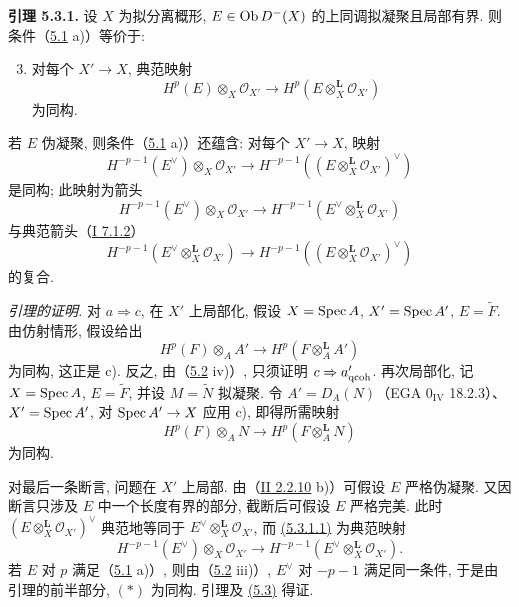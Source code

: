 \textbf{引理 5.3.1.} 设 \(X\) 为拟分离概形, \(E\in\operatorname{Ob} D^{-}(X)\) 的上同调拟凝聚且局部有界. 则条件（\hyperlink{sga6.e03.lem.5-1}{5.1} a)）等价于:
\begin{enumerate}[label=\alph*)]
\setcounter{enumi}{2}
\item 对每个 \(X'\to X\), 典范映射
\[
 H^p(E)\otimes_X\mathcal O_{X'}
 \longrightarrow
 H^p(E\otimes_X^{\mathbf L}\mathcal O_{X'})
\]
为同构.
\end{enumerate}
若 \(E\) 伪凝聚, 则条件（\hyperlink{sga6.e03.lem.5-1}{5.1} a)）还蕴含: 对每个 \(X'\to X\), 映射
\[
 H^{-p-1}(E^{\vee})\otimes_X\mathcal O_{X'}
 \longrightarrow
 H^{-p-1}((E\otimes_X^{\mathbf L}\mathcal O_{X'})^{\vee})
\tag{5.3.1.1}
\]
是同构; 此映射为箭头
\[
H^{-p-1}(E^{\vee})\otimes_X\mathcal O_{X'}
\longrightarrow H^{-p-1}(E^{\vee}\otimes_X^{\mathbf L}\mathcal O_{X'})
\]
与典范箭头（\hyperlink{sga6.e01.prop.7-1-2}{I 7.1.2}）
\[
H^{-p-1}(E^{\vee}\otimes_X^{\mathbf L}\mathcal O_{X'})
\longrightarrow H^{-p-1}((E\otimes_X^{\mathbf L}\mathcal O_{X'})^{\vee})
\]
的复合.

\emph{引理的证明.} 对 \(a\Rightarrow c\), 在 \(X'\) 上局部化, 假设 \(X=\operatorname{Spec} A\), \(X'=\operatorname{Spec} A'\), \(E=\widetilde F\). 由仿射情形, 假设给出
\[
 H^p(F)\otimes_AA'
 \longrightarrow
 H^p(F\otimes_A^{\mathbf L}A')
\]
为同构, 这正是 c). 反之, 由（\hyperlink{sga6.e03.rem.5-2}{5.2} iv)）, 只须证明 \(c\Rightarrow a'_{\mathrm{qcoh}}\). 再次局部化, 记 \(X=\operatorname{Spec} A\), \(E=\widetilde F\), 并设 \(M=\widetilde N\) 拟凝聚. 令 \(A'=D_A(N)\)（EGA \(0_{\mathrm{IV}}\) 18.2.3）、\(X'=\operatorname{Spec} A'\), 对 \(\operatorname{Spec} A'\to X\) 应用 c), 即得所需映射
\[
 H^p(F)\otimes_AN
 \longrightarrow
 H^p(F\otimes_A^{\mathbf L}N)
\]
为同构.

对最后一条断言, 问题在 \(X'\) 上局部. 由（\hyperlink{sga6.e02.rem.2-2-10}{II 2.2.10} b)）可假设 \(E\) 严格伪凝聚. 又因断言只涉及 \(E\) 中一个长度有界的部分, 截断后可假设 \(E\) 严格完美. 此时 \((E\otimes_X^{\mathbf L}\mathcal O_{X'})^{\vee}\) 典范地等同于 \(E^{\vee}\otimes_X^{\mathbf L}\mathcal O_{X'}\), 而 \hyperlink{sga6.e03.eq.5-3-1-1}{(5.3.1.1)} 为典范映射
\[
 H^{-p-1}(E^{\vee})\otimes_X\mathcal O_{X'}
 \longrightarrow
 H^{-p-1}(E^{\vee}\otimes_X^{\mathbf L}\mathcal O_{X'}).
\tag{*}
\]
若 \(E\) 对 \(p\) 满足（\hyperlink{sga6.e03.lem.5-1}{5.1} a)）, 则由（\hyperlink{sga6.e03.rem.5-2}{5.2} iii)）, \(E^{\vee}\) 对 \(-p-1\) 满足同一条件, 于是由引理的前半部分, \((*)\) 为同构. 引理及 \hyperlink{sga6.e03.prop.5-3}{(5.3)} 得证.

